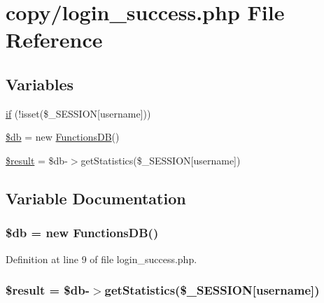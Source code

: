 \hypertarget{copy_2login__success_8php}{}\section{copy/login\+\_\+success.php File Reference}
\label{copy_2login__success_8php}
\subsection*{Variables}
\begin{DoxyCompactItemize}
\item 
\hyperlink{copy_2login__success_8php_a417be69c2182c77301b6d9d54792e7e5}{if} (!isset(\$\+\_\+\+S\+E\+S\+S\+I\+O\+N\mbox{[}\textquotesingle{}username\textquotesingle{}\mbox{]}))
\item 
\hyperlink{copy_2login__success_8php_a1fa3127fc82f96b1436d871ef02be319}{\$db} = new \hyperlink{class_functions_d_b}{Functions\+D\+B}()
\item 
\hyperlink{copy_2login__success_8php_a112ef069ddc0454086e3d1e6d8d55d07}{\$result} = \$db-\/$>$get\+Statistics(\$\+\_\+\+S\+E\+S\+S\+I\+O\+N\mbox{[}\textquotesingle{}username\textquotesingle{}\mbox{]})
\end{DoxyCompactItemize}


\subsection{Variable Documentation}
\hypertarget{copy_2login__success_8php_a1fa3127fc82f96b1436d871ef02be319}{}
\subsubsection[{\$db}]{\setlength{\rightskip}{0pt plus 5cm}\$db = new {\bf Functions\+D\+B}()}\label{copy_2login__success_8php_a1fa3127fc82f96b1436d871ef02be319}


Definition at line 9 of file login\+\_\+success.\+php.

\hypertarget{copy_2login__success_8php_a112ef069ddc0454086e3d1e6d8d55d07}{}
\subsubsection[{\$result}]{\setlength{\rightskip}{0pt plus 5cm}\$result = \$db-\/$>$get\+Statistics(\$\+\_\+\+S\+E\+S\+S\+I\+O\+N\mbox{[}\textquotesingle{}username\textquotesingle{}\mbox{]})}\label{copy_2login__success_8php_a112ef069ddc0454086e3d1e6d8d55d07}


